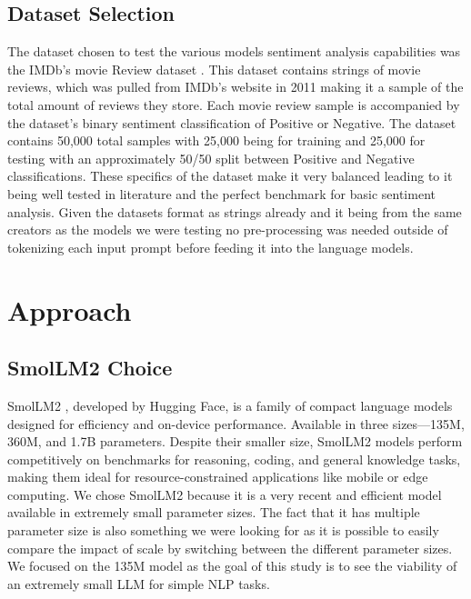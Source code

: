 \documentclass[10pt,twocolumn,letterpaper]{article}
\begin{document}
\subsection{Dataset Selection}
The dataset chosen to test the various models sentiment analysis capabilities was the IMDb's movie Review dataset \cite{IMDB-dataset}. This dataset contains strings of movie reviews, which was pulled from IMDb's website in 2011 making it a sample of the total amount of reviews they store. Each movie review sample is accompanied by the dataset's binary sentiment classification of Positive or Negative. The dataset contains 50,000 total samples with 25,000 being for training and 25,000 for testing with an approximately 50/50 split between Positive and Negative classifications. These specifics of the dataset make it very balanced leading to it being well tested in literature and the perfect benchmark for basic sentiment analysis. Given the datasets format as strings already and it being from the same creators as the models we were testing no pre-processing was needed outside of tokenizing each input prompt before feeding it into the language models. 




\section{Approach}



\subsection{SmolLM2 Choice}
SmolLM2 \cite{hf-SmolLM-usecase}, developed by Hugging Face, is a family of compact language models designed for efficiency and on-device performance. Available in three sizes—135M, 360M, and 1.7B parameters. Despite their smaller size, SmolLM2 models perform competitively on benchmarks for reasoning, coding, and general knowledge tasks, making them ideal for resource-constrained applications like mobile or edge computing.
We chose SmolLM2 because it is a very recent and efficient model available in extremely small parameter sizes. The fact that it has multiple parameter size is also something we were looking for as it is possible to easily compare the impact of scale by switching between the different parameter sizes. We focused on the 135M model as the goal of this study is to see the viability of an extremely small LLM for simple NLP tasks. 
\end{document}
